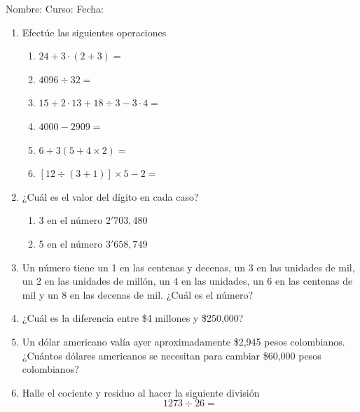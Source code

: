 \documentclass[letterpaper,fleqn]{article}
\newcommand{\LineaNombre}{%
\par
\vspace{\baselineskip}
Nombre:\hrulefill \; Curso: \underline{\hspace*{48pt}} \; Fecha: \underline{\hspace*{2.5cm}} \relax
\par}
\begin{document}
\LineaNombre
\begin{enumerate}
\item Efectúe las siguientes operaciones
\begin{enumerate}
\item $24+3\cdot (2+3)=$\noanswer
\item $4096\div 32=$ \noanswer
\item $15+2\cdot 13+18\div 3-3\cdot 4=$ \noanswer
\item $4000-2909=$\noanswer
\item $6+3(5+4\times 2)=$\noanswer
\item $[12\div (3+1)]\times 5-2=$\noanswer
\end{enumerate}
 \item ¿Cuál es el valor del dígito en cada caso?
 \begin{enumerate}
 \item 3 en el número $2'703,480$ \noanswer
 \item 5 en el número $3'658,749$ \noanswer
 \end{enumerate}
 \newpage
 \item Un número tiene un 1 en las centenas y decenas, un 3 en las unidades de mil, un 2 en las unidades de millón, un 4 en las unidades, un 6 en las centenas de mil y un 8 en las decenas de mil. ¿Cuál es el número?\noanswer
 \item ¿Cuál es la diferencia entre \$4 millones y \$250,000? \noanswer
 \item Un dólar americano valía ayer aproximadamente \$2,945 pesos colombianos. ¿Cuántos dólares americanos se necesitan para cambiar \$60,000 pesos colombianos?\noanswer
 \item Halle el cociente y residuo al hacer la siguiente división
 \[1273\div 26=\]\noanswer
 \end{enumerate}
\end{document}
